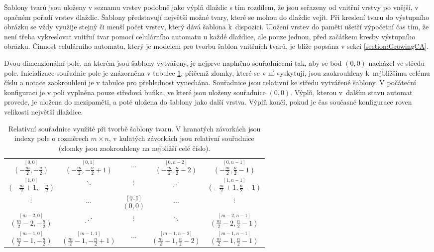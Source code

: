 Šablony tvarů jsou uloženy v seznamu vrstev podobně jako výplň dlaždic s tím rozdílem, že jsou seřazeny od vnitřní vrstvy po vnější, v opačném pořadí vrstev dlaždic. Šablony představují největší možné tvary, které se mohou do dlaždic vejít. Při kreslení tvaru do výstupního obrázku se vždy využije stejný či menší počet vrstev, který dává šablona k~dispozici. Uložení vrstev do paměti ušetří výpočetní čas tím, že není třeba vykreslovat vnitřní tvar pomocí celulárního automatu u každé dlaždice, ale pouze jednou, před začátkem kresby výstupního obrázku. Činnost celulárního automatu, který je modelem pro tvorbu šablon vnitřních tvarů, je blíže popsána v sekci \ref{section:GrowingCA}. 

Dvou-dimenzionální pole, na kterém jsou šablony vytvářeny, je nejprve naplněno souřadnicemi tak, aby se bod $(0, 0)$ nacházel ve středu pole. Inicializace souřadnic pole je znázorněna v tabulce \ref{tab:PoleSablony}, přičemž zlomky, které se v ní vyskytují, jsou zaokrouhleny k~nejbližšímu celému číslu a notace zaokrouhlení je v tabulce pro přehlednost vynechána. 
Souřadnice jsou relativní ke středu vytvářené šablony. V počáteční konfiguraci je v poli vyplněna pouze středová buňka, ve které jsou uloženy souřadnice $(0, 0)$. Výplň, kterou v~dalším stavu automat provede, je uložena do mezipaměti, a poté uložena do šablony jako další vrstva. Výplň končí, pokud je čas současné konfigurace roven velikosti největší dlaždice.

\begin{table}[H]
    \centering
    \begin{tabular}{ c c c c c }
    $\overset{[0,0]}{(-\frac{m}{2},-\frac{n}{2})}$ & $\overset{[0,1]}{(-\frac{m}{2},-\frac{n}{2} + 1)}$ & $\hdots$ & $\overset{[0, n - 2]}{(-\frac{m}{2},\frac{n}{2} - 2)}$ & $\overset{[0, n - 1]}{(-\frac{m}{2},\frac{n}{2} - 1)}$ \\ 
    $\overset{[1 ,0]}{(-\frac{m}{2} + 1,-\frac{n}{2})}$ & $\ddots$ & $\vdots$ & $\reflectbox{$\ddots$}$ & $\overset{[1, n - 1]}{(-\frac{m}{2} + 1,\frac{n}{2} - 1)}$ \\ 
    $\vdots$ & $\hdots$ & $\overset{[\frac{m}{2},\frac{n}{2}]}{(0,0)}$ & $\hdots$ & $\vdots$ \\ 
    $\overset{[m - 2,0]}{(\frac{m}{2} - 2, -\frac{n}{2})}$ & $\reflectbox{$\ddots$}$ & $\vdots$ & $\ddots$ & $\overset{[m - 2,n - 1]}{(\frac{m}{2} - 2,\frac{n}{2} - 1)}$ \\ 
    $\overset{[m - 1,0]}{(\frac{m}{2} - 1, -\frac{n}{2})}$ & $\overset{[m - 1,1]}{(\frac{m}{2} - 1, -\frac{n}{2} + 1)}$ & $\hdots$ & $\overset{[m - 1,n - 2]}{(\frac{m}{2} - 1,\frac{n}{2} - 2)}$ & $\overset{[m - 1,n - 1]}{(\frac{m}{2} - 1,\frac{n}{2} - 1)}$ \\ 
    \end{tabular}
    
    \caption{Relativní souřadnice využité při tvorbě šablony tvaru. V hranatých závorkách jsou indexy pole o rozměrech $m \times n$, v kulatých závorkách jsou relativní souřadnice (zlomky jsou zaokrouhleny na nejbližší celé číslo).}
    \label{tab:PoleSablony}
\end{table}

